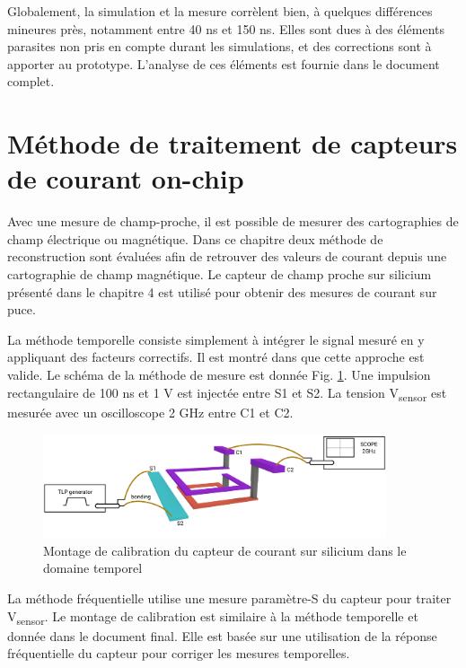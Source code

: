 Globalement, la simulation et la mesure corrèlent bien, à quelques différences mineures près, notamment entre 40 ns et 150 ns.
Elles sont dues à des éléments parasites non pris en compte durant les simulations, et des corrections sont à apporter au prototype.
L'analyse de ces éléments est fournie dans le document complet.

\section{Méthode de traitement de capteurs de courant on-chip}

Avec une mesure de champ-proche, il est possible de mesurer des cartographies de champ électrique ou magnétique.
Dans ce chapitre deux méthode de reconstruction sont évaluées afin de retrouver des valeurs de courant depuis une cartographie de champ magnétique.
Le capteur de champ proche sur silicium présenté dans le chapitre 4 est utilisé pour obtenir des mesures de courant sur puce.

La méthode temporelle consiste simplement à intégrer le signal mesuré en y appliquant des facteurs correctifs.
Il est montré dans \cite{near-field-scan} que cette approche est valide.
Le schéma de la méthode de mesure est donnée Fig. \ref{fig:calibration-sensor}.
Une impulsion rectangulaire de 100 ns et 1 V est injectée entre S1 et S2.
La tension V\textsubscript{sensor} est mesurée avec un oscilloscope 2 GHz entre C1 et C2.

\begin{figure}[!h]
  \centering
  \includegraphics[width=0.9\textwidth]{src/1/figures/sensor_measurement_setup.pdf}
  \caption{Montage de calibration du capteur de courant sur silicium dans le domaine temporel}
  \label{fig:calibration-sensor}
\end{figure}

La méthode fréquentielle utilise une mesure paramètre-S du capteur pour traiter V\textsubscript{sensor}.
Le montage de calibration est similaire à la méthode temporelle et donnée dans le document final.
Elle est basée sur une utilisation de la réponse fréquentielle du capteur pour corriger les mesures temporelles.

